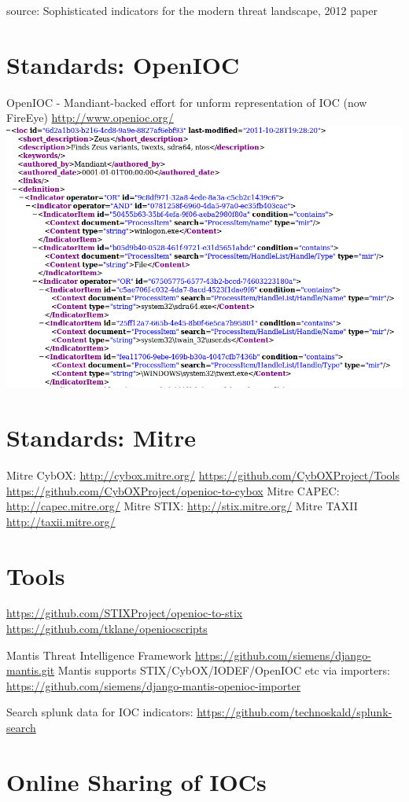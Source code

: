\documentclass[11pt]{article}
\begin{document}
source: Sophisticated indicators for the modern threat landscape, 2012
paper
\section*{Standards: OpenIOC}
\label{sec-3}

OpenIOC - Mandiant-backed effort for unform representation of IOC
(now FireEye)
\url{http://www.openioc.org/}
\includegraphics[width=.9\linewidth]{images/zeus-ioc.png}
\section*{Standards: Mitre}
\label{sec-4}

Mitre CybOX:
\url{http://cybox.mitre.org/}
\url{https://github.com/CybOXProject/Tools}
\url{https://github.com/CybOXProject/openioc-to-cybox}
Mitre CAPEC:
\url{http://capec.mitre.org/}
Mitre STIX:
\url{http://stix.mitre.org/}
Mitre TAXII
\url{http://taxii.mitre.org/}
\section*{Tools}
\label{sec-5}

\url{https://github.com/STIXProject/openioc-to-stix}
\url{https://github.com/tklane/openiocscripts} 

Mantis Threat Intelligence Framework
 \url{https://github.com/siemens/django-mantis.git}
Mantis supports STIX/CybOX/IODEF/OpenIOC etc via
importers: \url{https://github.com/siemens/django-mantis-openioc-importer}


Search splunk data for IOC indicators:
\url{https://github.com/technoskald/splunk-search}
\section*{Online Sharing of IOCs}
\label{sec-6}
\end{document}

